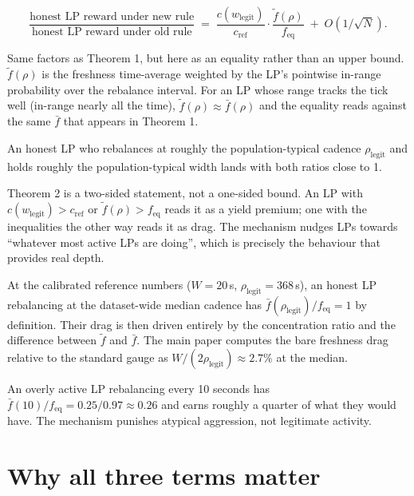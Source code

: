 \documentclass[11pt,a4paper]{article}
\begin{document}
\begin{result}
\[
\frac{\text{honest LP reward under new rule}}{\text{honest LP reward under old rule}} \;=\; \frac{c(w_{\text{legit}})}{c_{\text{ref}}} \cdot \frac{\tilde f(\rho)}{f_{\text{eq}}} \;+\; O(1/\sqrt N).
\]
\end{result}

Same factors as Theorem 1, but here as an equality rather than an upper bound. $\tilde f(\rho)$ is the freshness time-average weighted by the LP's pointwise in-range probability over the rebalance interval. For an LP whose range tracks the tick well (in-range nearly all the time), $\tilde f(\rho) \approx \bar f(\rho)$ and the equality reads against the same $\bar f$ that appears in Theorem 1.

An honest LP who rebalances at roughly the population-typical cadence $\rho_{\text{legit}}$ and holds roughly the population-typical width lands with both ratios close to 1.

\begin{intuition}
Theorem 2 is a two-sided statement, not a one-sided bound. An LP with $c(w_{\text{legit}}) > c_{\text{ref}}$ or $\tilde f(\rho) > f_{\text{eq}}$ reads it as a yield premium; one with the inequalities the other way reads it as drag. The mechanism nudges LPs towards ``whatever most active LPs are doing'', which is precisely the behaviour that provides real depth.
\end{intuition}

\begin{example}
At the calibrated reference numbers ($W = 20$\,s, $\rho_{\text{legit}} = 368$\,s), an honest LP rebalancing at the dataset-wide median cadence has $\bar f(\rho_{\text{legit}})/f_{\text{eq}} = 1$ by definition. Their drag is then driven entirely by the concentration ratio and the difference between $\tilde f$ and $\bar f$. The main paper computes the bare freshness drag relative to the standard gauge as $W/(2\rho_{\text{legit}}) \approx 2.7\%$ at the median.

An overly active LP rebalancing every 10 seconds has $\bar f(10)/f_{\text{eq}} = 0.25/0.97 \approx 0.26$ and earns roughly a quarter of what they would have. The mechanism punishes atypical aggression, not legitimate activity.
\end{example}

\section{Why all three terms matter}
\end{document}

